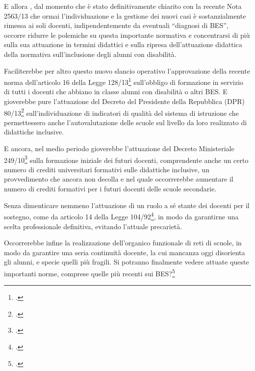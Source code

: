 E allora , dal momento che è stato definitivamente chiarito con la recente Nota 2563/13 che ormai l'individuazione e la gestione dei nuovi casi è sostanzialmente rimessa ai soli docenti, indipendentemente da eventuali “diagnosi di BES”, occorre ridurre le polemiche su questa importante normativa e concentrarsi di più sulla sua attuazione in termini didattici e sulla ripresa dell'attuazione didattica della normativa sull'inclusione degli alunni con disabilità.

Faciliterebbe per altro questo nuovo slancio operativo l'approvazione della recente norma dell'articolo 16 della Legge 128/13\footcite{Legge_128_2013} sull'obbligo di formazione in servizio di tutti i docenti che abbiano in classe alunni con disabilità o altri BES. E gioverebbe pure l'attuazione del Decreto del Presidente della Repubblica (DPR) 80/13\footcite{DPR_80_2013} sull'individuazione di indicatori di qualità del sistema di istruzione che permettessero anche l'autovalutazione delle scuole sul livello da loro realizzato di didattiche inclusive.

E ancora, nel medio periodo gioverebbe l'attuazione del Decreto Ministeriale 249/10\footcite{DM_249_2010} sulla formazione iniziale dei futuri docenti, comprendente anche un certo numero di crediti universitari formativi sulle didattiche inclusive, un provvedimento che ancora non decolla e nel quale occorrerebbe aumentare il numero di crediti formativi per i futuri docenti delle scuole secondarie.

Senza dimenticare nemmeno l'attuazione di un ruolo a sé stante dei docenti per il sostegno, come da articolo 14 della Legge 104/92\footcite{Legge_104_92}, in modo da garantirne una scelta professionale definitiva, evitando l'attuale precarietà.

Occorrerebbe infine la realizzazione dell'organico funzionale di reti di scuole, in modo da garantire una seria continuità docente, la cui mancanza oggi disorienta gli alunni, e specie quelli più fragili. Si potranno finalmente vedere attuate queste importanti norme, comprese quelle più recenti sui BES?\footcite{Nocera2013d}
